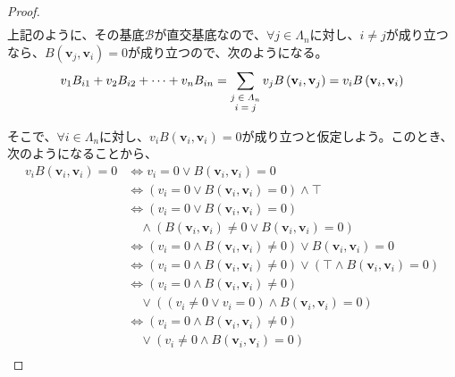 \documentclass[dvipdfmx]{jsarticle}
\begin{document}
\begin{proof}
\begin{align*}
\end{align*}
上記のように、その基底$\mathcal{B}$が直交基底なので、$\forall j \in \varLambda_{n}$に対し、$i \neq j$が成り立つなら、$B\left( \mathbf{v}_{j},\mathbf{v}_{i} \right) = 0$が成り立つので、次のようになる。
\begin{align*}
v_{1}B_{i1} + v_{2}B_{i2} + \cdots + v_{n}B_{in} = \sum_{\scriptsize \begin{matrix} j \in \varLambda_{n} \\i = j \end{matrix}} {v_{j}B\left( \mathbf{v}_{i},\mathbf{v}_{j} \right)} = v_{i}B\left( \mathbf{v}_{i},\mathbf{v}_{i} \right)
\end{align*}\par
そこで、$\forall i \in \varLambda_{n}$に対し、$v_{i}B\left( \mathbf{v}_{i},\mathbf{v}_{i} \right) = 0$が成り立つと仮定しよう。このとき、次のようになることから、
\begin{align*}
v_{i}B\left( \mathbf{v}_{i},\mathbf{v}_{i} \right) = 0 &\Leftrightarrow v_{i} = 0 \vee B\left( \mathbf{v}_{i},\mathbf{v}_{i} \right) = 0\\
&\Leftrightarrow \left( v_{i} = 0 \vee B\left( \mathbf{v}_{i},\mathbf{v}_{i} \right) = 0 \right) \land \top\\
&\Leftrightarrow \left( v_{i} = 0 \vee B\left( \mathbf{v}_{i},\mathbf{v}_{i} \right) = 0 \right) \\
&\quad \land \left( B\left( \mathbf{v}_{i},\mathbf{v}_{i} \right) \neq 0 \vee B\left( \mathbf{v}_{i},\mathbf{v}_{i} \right) = 0 \right)\\
&\Leftrightarrow \left( v_{i} = 0 \land B\left( \mathbf{v}_{i},\mathbf{v}_{i} \right) \neq 0 \right) \vee B\left( \mathbf{v}_{i},\mathbf{v}_{i} \right) = 0\\
&\Leftrightarrow \left( v_{i} = 0 \land B\left( \mathbf{v}_{i},\mathbf{v}_{i} \right) \neq 0 \right) \vee \left( \top \land B\left( \mathbf{v}_{i},\mathbf{v}_{i} \right) = 0 \right)\\
&\Leftrightarrow \left( v_{i} = 0 \land B\left( \mathbf{v}_{i},\mathbf{v}_{i} \right) \neq 0 \right) \\
&\quad \vee \left( \left( v_{i} \neq 0 \vee v_{i} = 0 \right) \land B\left( \mathbf{v}_{i},\mathbf{v}_{i} \right) = 0 \right)\\
&\Leftrightarrow \left( v_{i} = 0 \land B\left( \mathbf{v}_{i},\mathbf{v}_{i} \right) \neq 0 \right) \\
&\quad \vee \left( v_{i} \neq 0 \land B\left( \mathbf{v}_{i},\mathbf{v}_{i} \right) = 0 \right) \\

\end{align*}
\end{proof}
\end{document}
